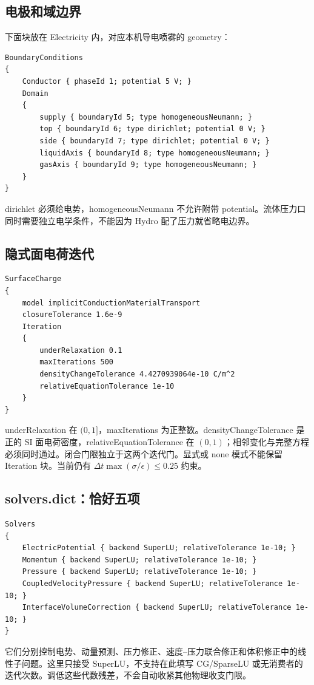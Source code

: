 \documentclass[a4paper,11pt]{article}
\begin{document}
\subsection{电极和域边界}
下面块放在 Electricity 内，对应本机导电喷雾的 geometry：
\begin{lstlisting}
BoundaryConditions
{
    Conductor { phaseId 1; potential 5 V; }
    Domain
    {
        supply { boundaryId 5; type homogeneousNeumann; }
        top { boundaryId 6; type dirichlet; potential 0 V; }
        side { boundaryId 7; type dirichlet; potential 0 V; }
        liquidAxis { boundaryId 8; type homogeneousNeumann; }
        gasAxis { boundaryId 9; type homogeneousNeumann; }
    }
}
\end{lstlisting}
dirichlet 必须给电势，homogeneousNeumann 不允许附带 potential。流体压力口同时需要独立电学条件，不能因为 Hydro 配了压力就省略电边界。

\subsection{隐式面电荷迭代}
\begin{lstlisting}
SurfaceCharge
{
    model implicitConductionMaterialTransport
    closureTolerance 1.6e-9
    Iteration
    {
        underRelaxation 0.1
        maxIterations 500
        densityChangeTolerance 4.4270939064e-10 C/m^2
        relativeEquationTolerance 1e-10
    }
}
\end{lstlisting}
underRelaxation 在 $(0,1]$，maxIterations 为正整数。densityChangeTolerance 是正的 SI 面电荷密度，relativeEquationTolerance 在 $(0,1)$；相邻变化与完整方程必须同时通过。闭合门限独立于这两个迭代门。显式或 none 模式不能保留 Iteration 块。当前仍有 $\Delta t\max(\sigma/\epsilon)\le0.25$ 约束。

\subsection{solvers.dict：恰好五项}
\begin{lstlisting}
Solvers
{
    ElectricPotential { backend SuperLU; relativeTolerance 1e-10; }
    Momentum { backend SuperLU; relativeTolerance 1e-10; }
    Pressure { backend SuperLU; relativeTolerance 1e-10; }
    CoupledVelocityPressure { backend SuperLU; relativeTolerance 1e-10; }
    InterfaceVolumeCorrection { backend SuperLU; relativeTolerance 1e-10; }
}
\end{lstlisting}
它们分别控制电势、动量预测、压力修正、速度--压力联合修正和体积修正中的线性子问题。这里只接受 SuperLU，不支持在此填写 CG/SparseLU 或无消费者的迭代次数。调低这些代数残差，不会自动收紧其他物理收支门限。
\end{document}
